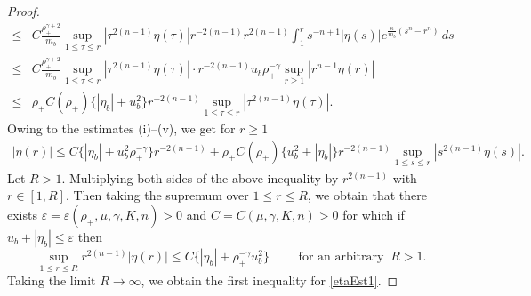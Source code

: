 \documentclass[a4paper,12pt,draft]{article}
\theoremstyle{remark}
\def\ep{\varepsilon}
\begin{document}
\begin{proof}
\begin{align*}
        \le& C\frac{\rho_{+}^{\gamma+2}}{m_b} \sup\limits_{1\le \tau \le r} |\tau^{2(n-1)}\eta(\tau)| r^{-2(n-1)} r^{2(n-1)}\int_{1}^r s^{-n+1} |\eta(s)| e^{\frac{\kappa}{m_b}(s^n-r^n)}\, ds\\
        \le & C\frac{\rho_{+}^{\gamma+2}}{m_b} \sup\limits_{1\le \tau \le r} |\tau^{2(n-1)}\eta(\tau)| \cdot r^{-2(n-1)}  u_b \rho_{+}^{-\gamma}\sup\limits_{r\ge 1} |r^{n-1} \eta(r)|\\
        \le& \rho_{+} C(\rho_{+})  \big\{ |\eta_b| + u_b^2 \big\} r^{-2(n-1)} \sup\limits_{1\le \tau\le r} |\tau^{2(n-1)} \eta(\tau)|.
    \end{align*}
    Owing to the estimates \textrm{(i)}--\textrm{(v)}, we get for $r\ge 1$
    \begin{align*}
        |\eta(r)| \le C \big\{ |\eta_b| + u_b^2 \rho_{+}^{-\gamma} \big\} r^{-2(n-1)}  + \rho_{+}  C(\rho_{+}) \big\{ u_b^2 + |\eta_b| \big\} r^{-2(n-1)} \sup\limits_{1\le s \le r} |s^{2(n-1)} \eta(s)|.
    \end{align*}
    Let $R>1$. Multiplying both sides of the above inequality by $r^{2(n-1)}$ with $r\in[1,R]$. Then taking the supremum over $1\le r \le R$, we obtain that there exists $\ep=\ep(\rho_+,\mu,\gamma,K,n)>0$ and $C=C(\mu,\gamma,K,n)>0$ for which if $u_b + |\eta_b|\le \ep$ then
    \begin{equation}\label{temp:first}
        \sup\limits_{1\le r \le R} r^{2(n-1)} |\eta(r)| \le C \big\{ |\eta_b| + \rho_{+}^{-\gamma} u_b^2  \big\} \qquad \text{ for an arbitrary } \ R >1.
    \end{equation}
    Taking the limit $R\to \infty$, we obtain the first inequality for \eqref{etaEst1}.
    

\end{proof}
\end{document}
